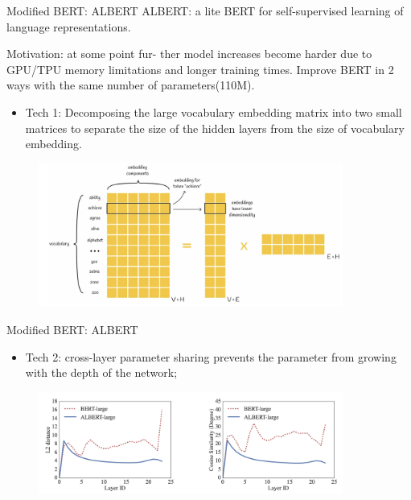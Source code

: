 \documentclass{beamer}
\begin{document}
\begin{frame}{Modified BERT: ALBERT}
  ALBERT: a lite BERT for self-supervised learning of language representations\cite{lan2020albertlitebertselfsupervised}.

  Motivation: at some point fur-
  ther model increases become harder due to GPU/TPU memory limitations and
  longer training times. Improve BERT in 2 ways with the same number of parameters(110M).
  \begin{itemize}
    \item Tech 1: Decomposing
    the large vocabulary embedding matrix into two small matrices to separate the size of the hidden
    layers from the size of vocabulary embedding.
  \end{itemize}
  \begin{figure}[H]
    \centering
    \includegraphics[width=10cm]{pictures/albert1.png}
  \end{figure}
\end{frame}
\begin{frame}{Modified BERT: ALBERT}
  \begin{itemize}
    \item Tech 2: cross-layer parameter sharing prevents the parameter from growing with the depth of the network;
  \end{itemize}
  \begin{figure}[H]
    \centering
    \includegraphics[width=10cm]{pictures/albert2.png}
  \end{figure}
\end{frame}
\end{document}

